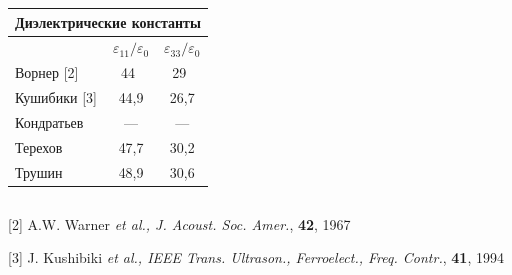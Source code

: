 \documentclass{beamer}
\begin{document}
{{\begin{columns}
\begin{table}
      \begin{tabular}{l c c}
        \multicolumn{3}{c}{Диэлектрические константы} \\
        \hline 
        & $\varepsilon_{11}/\varepsilon_{0}$ & $\varepsilon_{33}/\varepsilon_{0}$  \\
        \hline
        Ворнер [2] & 44$~~$ & 29$~~$  \\
        Кушибики [3] & 44,9 & 26,7   \\
        Кондратьев & --- & --- \\
        Терехов  & 47,7 & 30,2   \\
        Трушин & 48,9 & 30,6   \\
        \hline
      \end{tabular}
    \end{table}
  \end{columns}

    [2] A.W. Warner {\it{et al.}, J. Acoust. Soc. Amer.}, \textbf{42}, 1967
            
    \vspace*{-0.1cm}
    [3] J. Kushibiki {\it{et al.}, IEEE Trans. Ultrason., Ferroelect., Freq. Contr.}, \textbf{41}, 1994
    \vspace*{\baselineskip}
}
}




\end{document}
